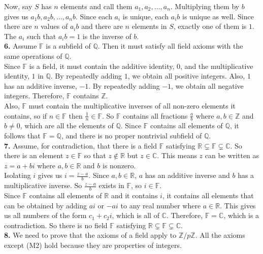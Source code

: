 \documentclass{article}
\newcommand{\FF}{\mathbb{F}}
\newcommand{\ZZ}{\mathbb{Z}}
\newcommand{\QQ}{\mathbb{Q}}
\newcommand{\RR}{\mathbb{R}}
\newcommand{\CC}{\mathbb{C}}
\begin{document}
Now, say $S$ has $n$ elements and call them $a_1, a_2, \ldots, a_n$. Multiplying them by $b$ gives us $a_1b, a_2b, \ldots, a_nb$. Since each $a_i$ is unique, each $a_ib$ is unique as well. Since there are $n$ values of $a_ib$ and there are $n$ elements in $S$, exactly one of them is $1$. The $a_i$ such that $a_ib = 1$ is the inverse of $b$. \\

\textbf{6.} Assume $\FF$ is a subfield of $\QQ$. Then it must satisfy all field axioms with the same operations of $\QQ$. \\

Since $\FF$ is a field, it must contain the additive identity, $0$, and the multiplicative identity, $1$ in $\QQ$. By repeatedly adding $1$, we obtain all positive integers. Also, $1$ has an additive inverse, $-1$. By repeatedly adding $-1$, we obtain all negative integers. Therefore, $\FF$ contains $\ZZ$. \\

Also, $\FF$ must contain the multiplicative inverses of all non-zero elements it contains, so if $n \in \FF$ then $\frac{1}{n} \in \FF$. So $\FF$ contains all fractions $\frac{a}{b}$ where $a, b \in \ZZ$ and $b \neq 0$, which are all the elements of $\QQ$. Since $\FF$ contains all elements of $\QQ$, it follows that $\FF = \QQ$, and there is no proper nontrivial subfield of $\QQ$. \\

\textbf{7.} Assume, for contradiction, that there is a field $\FF$ satisfying $\RR \subsetneq \FF \subsetneq \CC$. So there is an element $z \in \FF$ so that $z \not \in \RR$ but $z \in \CC$. This means $z$ can be written as $z = a + bi$ where $a, b \in \RR$ and $b$ is nonzero. \\

Isolating $i$ gives us $i = \frac{z - a}{b}$. Since $a, b \in \RR$, $a$ has an additive inverse and $b$ has a multiplicative inverse. So $\frac{z - a}{b}$ exists in $\FF$, so $i \in \FF$. \\

Since $\FF$ contains all elements of $\RR$ and it contains $i$, it contains all elements that can be obtained by adding $ai$ or $-ai$ to any real number where $a \in \RR$. This gives us all numbers of the form $c_1 + c_2i$, which is all of $\CC$. Therefore, $\FF = \CC$, which is a contradiction. So there is no field $\FF$ satisfying $\RR \subsetneq \FF \subsetneq \CC$. \\

\textbf{8.} We need to prove that the axioms of a field apply to $\ZZ/p\ZZ$. All the axioms except (M2) hold because they are properties of integers. \\
\end{document}
